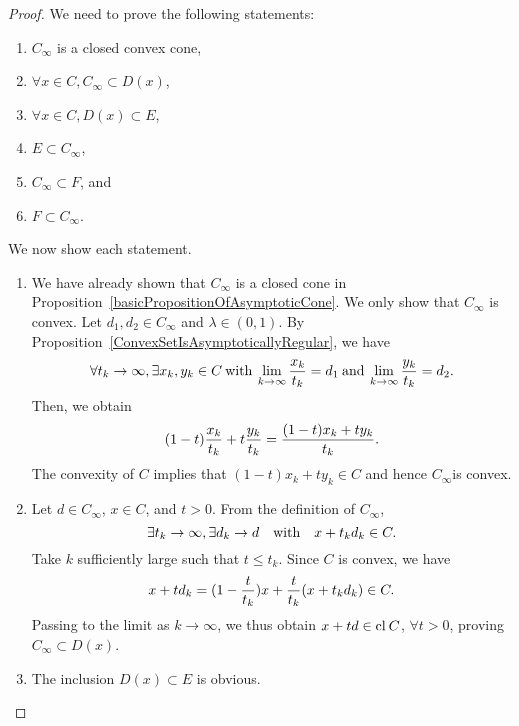 \documentclass[a4paper,11pt, oneside]{book}
\theoremstyle{definition}
\newcommand{\Closure}[1]{\text{\rm cl\:${#1}$}} %
\begin{document}
\begin{proof}
  We need to prove the following statements:
  \begin{enumerate}[label=\roman*,align=CenterWithParen]
    \item $C_{\infty}$ is a closed convex cone,
    \item $\forall x \in C, C_{\infty} \subset D(x)$,
    \item $\forall x \in C, D(x) \subset E$,
    \item $E \subset C_{\infty}$,
    \item $C_{\infty} \subset F$, and
    \item $F \subset C_{\infty}$.
  \end{enumerate}
  We now show each statement.
  \begin{enumerate}[label=\roman*,align=CenterWithParen]
    \item We have already shown that $C_{\infty}$ is a closed cone in Proposition~\ref{basicPropositionOfAsymptoticCone}. We only show that $C_{\infty}$ is convex. Let $d_1, d_2 \in C_{\infty}$ and $\lambda \in (0,1)$. By Proposition~\ref{ConvexSetIsAsymptoticallyRegular}, we have
    \begin{equation}
      \forall t_k \to \infty, \exists x_k, y_k \in C \:\text{with}\: \lim_{k \to \infty} \frac{x_k}{t_k} = d_1 \: \text{and}\: \lim_{k \to \infty} \frac{y_k}{t_k} = d_2. \notag
    \end{equation}
    Then, we obtain
    \begin{equation}
      (1-t)\frac{x_k}{t_k} + t \frac{y_k}{t_k} = \frac{(1-t)x_k+ty_k}{t_k}. \notag
    \end{equation}
    The convexity of $C$ implies that $(1-t)x_k+ty_k \in C$ and hence $C_{\infty}$is convex.
    \item Let $d \in C_{\infty}$, $x \in C$, and $t>0$. From the definition of $C_{\infty}$,
    \begin{equation}
      \exists t_k \to \infty, \exists d_k \to d \quad \text{with} \quad x+ t_k d_k \in C. \notag
    \end{equation}
    Take $k$ sufficiently large such that $t \leq t_k$. Since $C$ is convex, we have
    \begin{equation}
      x + t d_k = (1 - \frac{t}{t_k})x + \frac{t}{t_k}(x + t_k d_k) \in C. \notag
    \end{equation}
    Passing to the limit as $k \to \infty$, we thus obtain $x + td \in \Closure{C}$, $\forall t>0$, proving $C_{\infty} \subset D(x)$.
    \item The inclusion $D(x) \subset E$ is obvious.

\end{enumerate}
\end{proof}
\end{document}

